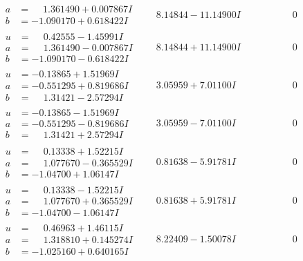 \documentclass[1p]{elsarticle_modified}
\theoremstyle{definition}
\begin{document}
$$\begin{array}{c|c|c}
\begin{aligned}
a &= \phantom{-}1.361490 + 0.007867 I \\
b &= -1.090170 + 0.618422 I\end{aligned}
 & \phantom{-}8.14844 - 11.14900 I & \phantom{-0.000000 } 0 \\ \hline\begin{aligned}
u &= \phantom{-}0.42555 - 1.45991 I \\
a &= \phantom{-}1.361490 - 0.007867 I \\
b &= -1.090170 - 0.618422 I\end{aligned}
 & \phantom{-}8.14844 + 11.14900 I & \phantom{-0.000000 } 0 \\ \hline\begin{aligned}
u &= -0.13865 + 1.51969 I \\
a &= -0.551295 + 0.819686 I \\
b &= \phantom{-}1.31421 - 2.57294 I\end{aligned}
 & \phantom{-}3.05959 + 7.01100 I & \phantom{-0.000000 } 0 \\ \hline\begin{aligned}
u &= -0.13865 - 1.51969 I \\
a &= -0.551295 - 0.819686 I \\
b &= \phantom{-}1.31421 + 2.57294 I\end{aligned}
 & \phantom{-}3.05959 - 7.01100 I & \phantom{-0.000000 } 0 \\ \hline\begin{aligned}
u &= \phantom{-}0.13338 + 1.52215 I \\
a &= \phantom{-}1.077670 - 0.365529 I \\
b &= -1.04700 + 1.06147 I\end{aligned}
 & \phantom{-}0.81638 - 5.91781 I & \phantom{-0.000000 } 0 \\ \hline\begin{aligned}
u &= \phantom{-}0.13338 - 1.52215 I \\
a &= \phantom{-}1.077670 + 0.365529 I \\
b &= -1.04700 - 1.06147 I\end{aligned}
 & \phantom{-}0.81638 + 5.91781 I & \phantom{-0.000000 } 0 \\ \hline\begin{aligned}
u &= \phantom{-}0.46963 + 1.46115 I \\
a &= \phantom{-}1.318810 + 0.145274 I \\
b &= -1.025160 + 0.640165 I\end{aligned}
 & \phantom{-}8.22409 - 1.50078 I & \phantom{-0.000000 } 0 \\ \hline\begin{aligned}

\end{aligned}
\end{array}$$
\end{document}
